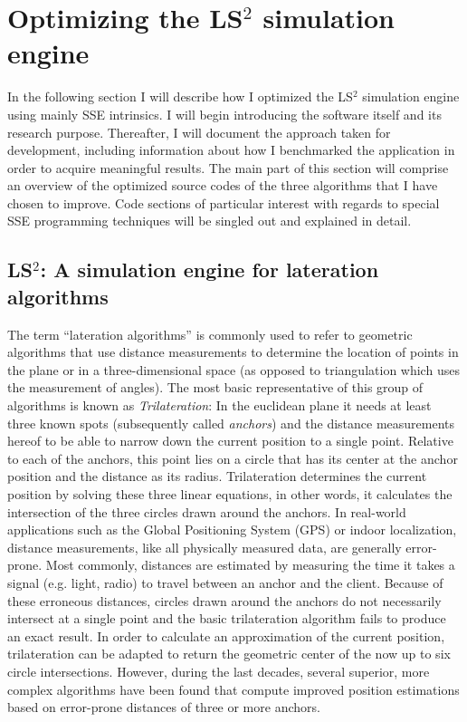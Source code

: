 \section{Optimizing the LS$^{2}$ simulation engine}
\label{Implementation}
In the following section I will describe how I optimized the LS$^{2}$ simulation engine using mainly SSE intrinsics. I will begin introducing the software itself and its research purpose. Thereafter, I will document the approach taken for development, including information about how I benchmarked the application in order to acquire meaningful results. The main part of this section will comprise an overview of the optimized source codes of the three algorithms that I have chosen to improve. Code sections of particular interest with regards to special SSE programming techniques will be singled out and explained in detail.

\subsection{LS$^{2}$: A simulation engine for lateration algorithms}
\label{ls2}
The term ``lateration algorithms'' is commonly used to refer to geometric algorithms that use distance measurements to determine the location of points in the plane or in a three-dimensional space (as opposed to triangulation which uses the measurement of angles). The most basic representative of this group of algorithms is known as \emph{Trilateration}: In the euclidean plane it needs at least three known spots (subsequently called \emph{anchors}) and the distance measurements hereof to be able to narrow down the current position to a single point. Relative to each of the anchors, this point lies on a circle that has its center at the anchor position and the distance as its radius. Trilateration determines the current position by solving these three linear equations, in other words, it calculates the intersection of the three circles drawn around the anchors. In real-world applications such as the Global Positioning System (GPS) or indoor localization, distance measurements, like all physically measured data, are generally error-prone. Most commonly, distances are estimated by measuring the time it takes a signal (e.g. light, radio) to travel between an anchor and the client. Because of these erroneous distances, circles drawn around the anchors do not necessarily intersect at a single point and the basic trilateration algorithm fails to produce an exact result. In order to calculate an approximation of the current position, trilateration can be adapted to return the geometric center of the now up to six circle intersections. However, during the last decades, several superior, more complex algorithms have been found that compute improved position estimations based on error-prone distances of three or more anchors.

